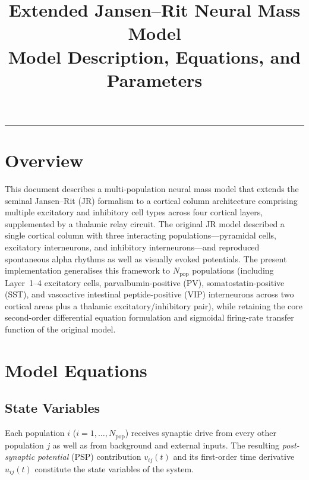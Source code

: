 \documentclass[12pt, a4paper]{article}
\title{\textbf{Extended Jansen--Rit Neural Mass Model}\\[0.5em]
\large Model Description, Equations, and Parameters}
\author{}
\date{}
\begin{document}
\maketitle
\tableofcontents
\vspace{1em}
\hrule
\vspace{1.5em}

\section{Overview}

This document describes a multi-population neural mass model that extends the seminal
Jansen--Rit (JR) formalism \cite{JansenRit1995} to a cortical column architecture
comprising multiple excitatory and inhibitory cell types across four cortical layers,
supplemented by a thalamic relay circuit.  The original JR model described a single
cortical column with three interacting populations---pyramidal cells, excitatory
interneurons, and inhibitory interneurons---and reproduced spontaneous alpha rhythms
as well as visually evoked potentials.  The present implementation generalises this
framework to $N_\text{pop}$ populations (including Layer~1--4 excitatory cells,
parvalbumin-positive (PV), somatostatin-positive (SST), and vasoactive
intestinal peptide-positive (VIP) interneurons across two cortical areas plus a
thalamic excitatory/inhibitory pair), while retaining the core second-order
differential equation formulation and sigmoidal firing-rate transfer function of
the original model.

\section{Model Equations}

\subsection{State Variables}

Each population $i$ ($i = 1,\dots,N_\text{pop}$) receives synaptic drive from every
other population $j$ as well as from background and external inputs.  The resulting
\emph{post-synaptic potential} (PSP) contribution $v_{ij}(t)$ and its first-order
time derivative $u_{ij}(t)$ constitute the state variables of the system.
\end{document}
